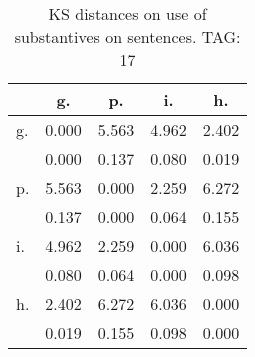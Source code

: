 \begin{table}[h!]
\begin{center}
\begin{tabular}{| l | c | c | c | c |}\hline
 & g. & p. & i. & h. \\\hline
g. & 0.000  & 5.563  & 4.962  & 2.402 \\\hline
 & 0.000  & 0.137  & 0.080  & 0.019 \\\hline
p. & 5.563  & 0.000  & 2.259  & 6.272 \\\hline
 & 0.137  & 0.000  & 0.064  & 0.155 \\\hline
i. & 4.962  & 2.259  & 0.000  & 6.036 \\\hline
 & 0.080  & 0.064  & 0.000  & 0.098 \\\hline
h. & 2.402  & 6.272  & 6.036  & 0.000 \\\hline
 & 0.019  & 0.155  & 0.098  & 0.000 \\\hline
\end{tabular}
\caption{KS distances on use of substantives on sentences. TAG: 17}
\end{center}
\end{table}